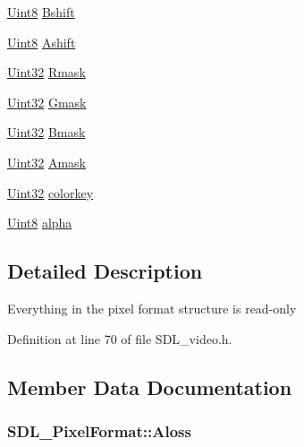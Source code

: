 \begin{DoxyCompactItemize}
\hyperlink{_s_d_l__stdinc_8h_a2944638813a090aa23e62f4da842c3e2}{Uint8} \hyperlink{struct_s_d_l___pixel_format_a4212574b67529628d8822ed4eb109754}{Bshift}
\item 
\hyperlink{_s_d_l__stdinc_8h_a2944638813a090aa23e62f4da842c3e2}{Uint8} \hyperlink{struct_s_d_l___pixel_format_ac3c4ffa0de1f2c94040340deede3bf46}{Ashift}
\item 
\hyperlink{_s_d_l__stdinc_8h_add440eff171ea5f55cb00c4a9ab8672d}{Uint32} \hyperlink{struct_s_d_l___pixel_format_a35e5793f6e9c356aec2d130167174946}{Rmask}
\item 
\hyperlink{_s_d_l__stdinc_8h_add440eff171ea5f55cb00c4a9ab8672d}{Uint32} \hyperlink{struct_s_d_l___pixel_format_a3d07a81b430202c6ea0089d8df8f4e15}{Gmask}
\item 
\hyperlink{_s_d_l__stdinc_8h_add440eff171ea5f55cb00c4a9ab8672d}{Uint32} \hyperlink{struct_s_d_l___pixel_format_ad366812df3ae62edb9ae6cb89234fddb}{Bmask}
\item 
\hyperlink{_s_d_l__stdinc_8h_add440eff171ea5f55cb00c4a9ab8672d}{Uint32} \hyperlink{struct_s_d_l___pixel_format_a6cdaf31f6cb153fefda47fa6b8368c0e}{Amask}
\item 
\hyperlink{_s_d_l__stdinc_8h_add440eff171ea5f55cb00c4a9ab8672d}{Uint32} \hyperlink{struct_s_d_l___pixel_format_a1413d87ed860296a49f8b2d8fd8ad778}{colorkey}
\item 
\hyperlink{_s_d_l__stdinc_8h_a2944638813a090aa23e62f4da842c3e2}{Uint8} \hyperlink{struct_s_d_l___pixel_format_a0b0fd9deaec730811212ecdeaa24c7ea}{alpha}
\end{DoxyCompactItemize}


\subsection{Detailed Description}
Everything in the pixel format structure is read-\/only 

Definition at line 70 of file S\+D\+L\+\_\+video.\+h.



\subsection{Member Data Documentation}
\hypertarget{struct_s_d_l___pixel_format_a660e95097874088292f1289a458efaa2}{}
\subsubsection[{Aloss}]{ S\+D\+L\+\_\+\+Pixel\+Format\+::\+Aloss}\label{struct_s_d_l___pixel_format_a660e95097874088292f1289a458efaa2}


